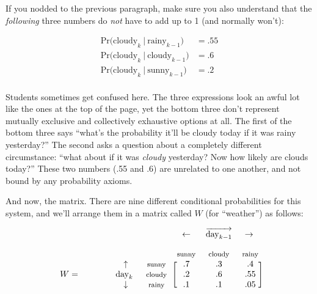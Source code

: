 \begin{alttitles}
\smallskip

If you nodded to the previous paragraph, make sure you also understand that the
\textit{following} three numbers do \textit{not} have to add up to 1 (and
normally won't):

\vspace{-.15in}
\begin{align*}
\textrm{Pr(cloudy}_k\ |\ \textrm{rainy}_{k-1}) &= .55 \\
\textrm{Pr(cloudy}_k\ |\ \textrm{cloudy}_{k-1}) &= .6 \\
\textrm{Pr(cloudy}_k\ |\ \textrm{sunny}_{k-1}) &= .2 \\
\end{align*}
\vspace{-.25in}


Students sometimes get confused here. The three expressions look an awful lot
like the ones at the top of the page, yet the bottom three don't represent
mutually exclusive and collectively exhaustive options at all. The first of the
bottom three says ``what's the probability it'll be cloudy today if it was
rainy yesterday?'' The second asks a question about a completely different
circumstance: ``what about if it was \textit{cloudy} yesterday? Now how likely
are clouds today?'' These two numbers (.55 and .6) are unrelated to one
another, and not bound by any probability axioms.

\bigskip

And now, the matrix. There are nine different conditional probabilities for
this system, and we'll arrange them in a matrix called $W$ (for ``weather'') as
follows:

\vspace{-.2in}
\[
\begin{blockarray}{ccccccccc}
& & & & \leftarrow & {\overrightarrow{\textrm{day}_{k-1}}} & \rightarrow \\[11pt]
& & & & {\footnotesize\textrm{sunny}} & {\footnotesize\textrm{cloudy}} &
{\footnotesize\textrm{rainy}} \\
\begin{block}{cccc[ccccc]}
& & \uparrow & {\footnotesize\textrm{sunny}} & .7 & .3 & .4 \\
{\large W =} \quad\quad\quad & & {\textrm{day}_k} \ \ & {\footnotesize\textrm{cloudy}} & .2 & .6 & .55 \\
& & \downarrow & {\footnotesize\textrm{rainy}} & .1 & .1 & .05 \\
\end{block}
\end{blockarray}
\]


\end{alttitles}
